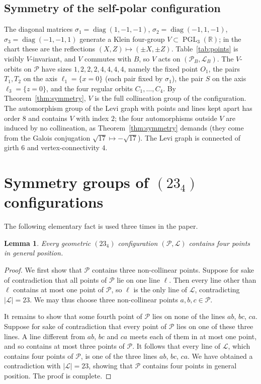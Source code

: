 \documentclass[11pt]{article}
\theoremstyle{plain}
\newtheorem{lemma}[theorem]{Lemma}
\theoremstyle{definition}
\newcommand{\RR}{\mathbb{R}}
\newcommand{\cP}{\mathcal{P}}
\newcommand{\cL}{\mathcal{L}}
\newcommand{\PGL}{\operatorname{PGL}}
\begin{document}
\subsection{Symmetry of the self-polar configuration}
The diagonal matrices $\sigma_1=\operatorname{diag}(1,-1,-1)$, $\sigma_2=\operatorname{diag}(-1,1,-1)$, $\sigma_3=\operatorname{diag}(-1,-1,1)$ generate a Klein four-group $V\subset\PGL_3(\RR)$; in the chart these are the reflections $(X,Z)\mapsto(\pm X,\pm Z)$.  Table~\ref{tab:points} is visibly $V$-invariant, and $V$ commutes with $B$, so $V$ acts on $(\cP_B,\cL_B)$.  The $V$-orbits on $\cP$ have sizes $1,2,2,2,4,4,4,4$, namely the fixed point $O_1$, the pairs $T_1,T_2$ on the axis $\ell_1=\{x=0\}$ (each pair fixed by $\sigma_1$), the pair $S$ on the axis $\ell_3=\{z=0\}$, and the four regular orbits $C_1,\dots,C_4$.  By Theorem~\ref{thm:symmetry}, $V$ is the full collineation group of the configuration.  The automorphism group of the Levi graph with points and lines kept apart has order $8$ and contains $V$ with index $2$; the four automorphisms outside $V$ are induced by no collineation, as Theorem~\ref{thm:symmetry} demands (they come from the Galois conjugation $\sqrt{17}\mapsto-\sqrt{17}$).  The Levi graph is connected of girth $6$ and vertex-connectivity $4$.

\section{Symmetry groups of $(23_4)$ configurations}\label{sec:symmetry}

The following elementary fact is used three times in the paper.

\begin{lemma}\label{lem:general}
Every geometric $(23_4)$ configuration $(\cP,\cL)$ contains four points in general position.
\end{lemma}

\begin{proof}
We first show that $\cP$ contains three non-collinear points.  Suppose for sake of contradiction that all points of $\cP$ lie on one line $\ell$.  Then every line other than $\ell$ contains at most one point of $\cP$, so $\ell$ is the only line of $\cL$, contradicting $|\cL|=23$.  We may thus choose three non-collinear points $a,b,c\in\cP$.

It remains to show that some fourth point of $\cP$ lies on none of the lines $ab$, $bc$, $ca$.  Suppose for sake of contradiction that every point of $\cP$ lies on one of these three lines.  A line different from $ab$, $bc$ and $ca$ meets each of them in at most one point, and so contains at most three points of $\cP$.  It follows that every line of $\cL$, which contains four points of $\cP$, is one of the three lines $ab$, $bc$, $ca$.  We have obtained a contradiction with $|\cL|=23$, showing that $\cP$ contains four points in general position.  The proof is complete.
\end{proof}
\end{document}
